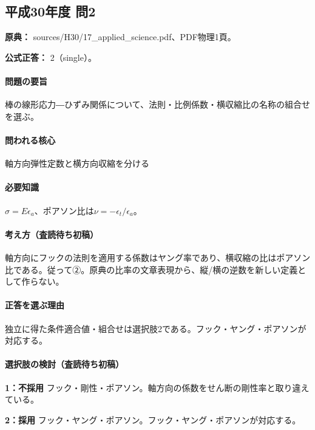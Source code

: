 \subsection{平成30年度 問2}
\label{q:h30-reg-applied-02}

\noindent\textbf{原典：} sources/H30/17\_applied\_science.pdf、PDF物理1頁。

\textbf{公式正答：} 2（single）。

\paragraph{問題の要旨} 棒の線形応力―ひずみ関係について、法則・比例係数・横収縮比の名称の組合せを選ぶ。

\paragraph{問われる核心} 軸方向弾性定数と横方向収縮を分ける

\paragraph{必要知識} \(\sigma=E\epsilon_a\)、ポアソン比は\(\nu=-\epsilon_t/\epsilon_a\)。

\paragraph{考え方（査読待ち初稿）} 軸方向にフックの法則を適用する係数はヤング率であり、横収縮の比はポアソン比である。従って②。原典の比率の文章表現から、縦/横の逆数を新しい定義として作らない。

\paragraph{正答を選ぶ理由} 独立に得た条件適合値・組合せは選択肢2である。フック・ヤング・ポアソンが対応する。

\paragraph{選択肢の検討（査読待ち初稿）}

\noindent\textbf{1：不採用} フック・剛性・ポアソン。軸方向の係数をせん断の剛性率と取り違えている。\par

\noindent\textbf{2：採用} フック・ヤング・ポアソン。フック・ヤング・ポアソンが対応する。\par

